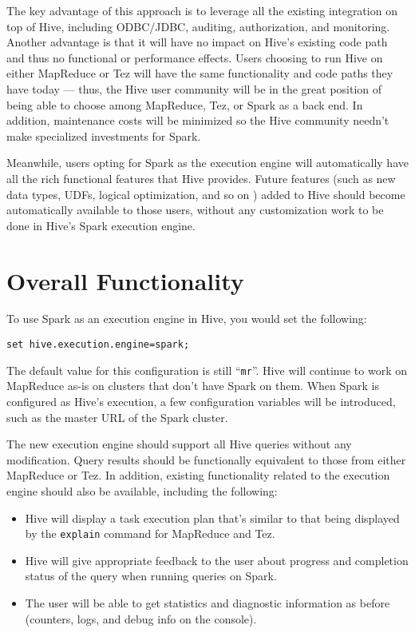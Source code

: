 \documentclass{vldb}
\begin{document}
The key advantage of this approach is to leverage all the existing
integration on top of Hive, including ODBC/JDBC, auditing,
authorization, and monitoring. Another advantage is that it will have no
impact on Hive's existing code path and thus no functional or
performance effects. Users choosing to run Hive on either MapReduce or
Tez will have the same functionality and code paths they have today ---
thus, the Hive user community will be in the great position of being
able to choose among MapReduce, Tez, or Spark as a back end. In
addition, maintenance costs will be minimized so the Hive community
needn't make specialized investments for Spark.

Meanwhile, users opting for Spark as the execution engine will
automatically have all the rich functional features that Hive provides.
Future features (such as new data types, UDFs, logical optimization, and
so on ) added to Hive should become automatically available to those
users, without any customization work to be done in Hive's Spark
execution engine.

\section{Overall Functionality}

To use Spark as an execution engine in Hive, you would set the
following:

\texttt{set hive.execution.engine=spark;}

The default value for this configuration is still ``\texttt{mr}''. Hive
will continue to work on MapReduce as-is on clusters that don't have
Spark on them. When Spark is configured as Hive's execution, a few
configuration variables will be introduced, such as the master URL of
the Spark cluster.

The new execution engine should support all Hive queries without any
modification. Query results should be functionally equivalent to those
from either MapReduce or Tez. In addition, existing functionality
related to the execution engine should also be available, including the
following:

\begin{itemize}
\itemsep1pt\parskip0pt
\item
  Hive will display a task execution plan that's similar to that being
  displayed by the \texttt{explain} command for MapReduce and Tez. ~~~~
\item
  Hive will give appropriate feedback to the user about progress and
  completion status of the query when running queries on Spark.
\item
  The user will be able to get statistics and diagnostic information as
  before (counters, logs, and debug info on the console).
\end{itemize}
\end{document}
